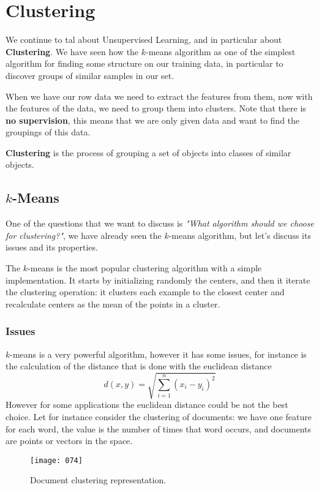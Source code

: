 \chapter{Clustering}
We continue to tal about Unsupervised Learning, and in particular about \textbf{Clustering}. We have seen how the \(k\)-means algorithm as one of the simplest algorithm for finding some structure on our training data, in particular to discover groups of similar samples in our set.

When we have our row data we need to extract the features from them, now with the features of the data, we need to group them into clusters. Note that there is \textbf{no supervision}, this means that we are only given data and want to find the groupings of this data.

\textbf{Clustering} is the process of grouping a set of objects into classes of similar objects.

\section{\(k\)-Means}
One of the questions that we want to discuss is \emph{"What algorithm should we choose for clustering?"}, we have already seen the \(k\)-means algorithm, but let's discuss its issues and its properties.

The \(k\)-means is the most popular clustering algorithm with a simple implementation. It starts by initializing randomly the centers, and then it iterate the clustering operation: it clusters each example to the closest center and recalculate centers as the mean of the points in a cluster. 

\subsection{Issues}
\(k\)-means is a very powerful algorithm, however it has some issues, for instance is the calculation of the distance that is done with the euclidean distance
\begin{equation}
    d(x,y) = \sqrt{\sum_{i=1}^n (x_i - y_i)^2}
\end{equation}
However for some applications the euclidean distance could be not the best choice. Let for instance consider the clustering of documents: we have one feature for each word, the value is the number of times that word occurs, and documents are points or vectors in the space. 

\begin{figure}[h!]
    \centering
    \texttt{[image: 074]}
    \caption{Document clustering representation.}
    \label{fig:074}
\end{figure}

